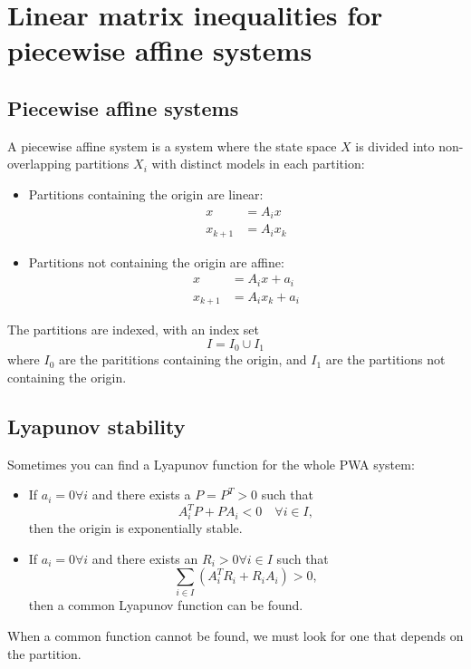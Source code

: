 \section{Linear matrix inequalities for piecewise affine systems}

\subsection{Piecewise affine systems}
A piecewise affine system is a system where the state space $X$ is divided into non-overlapping partitions $X_i$ with distinct models in each partition:
%
\begin{itemize}
  \item Partitions containing the origin are linear:
  \begin{equation}
    \begin{split}
      x &= A_i x \\
      x_{k+1} &= A_i x_k
    \end{split}
  \end{equation}
  \item Partitions not containing the origin are affine:
  \begin{equation}
    \begin{split}
      x &= A_i x + a_i \\
      x_{k+1} &= A_i x_k + a_i
    \end{split}
  \end{equation}
\end{itemize}
%
The partitions are indexed, with an index set
%
\begin{equation}
  I = I_0 \cup I_1
\end{equation}
%
where $I_0$ are the parititions containing the origin, and $I_1$ are the partitions not containing the origin.

\subsection{Lyapunov stability}
Sometimes you can find a Lyapunov function for the whole PWA system:
%
\begin{itemize}
  \item If $a_i = 0 \forall i$ and there exists a $P = P^T > 0$ such that
  \begin{equation}
    A_i^T P + P A_i < 0 \quad \forall i \in I,
  \end{equation}
  then the origin is exponentially stable.
  \item If $a_i = 0 \forall i$ and there exists an $R_i > 0 \forall i \in I$ such that
  \begin{equation}
    \sum_{i \in I} (A_i^T R_i + R_i A_i) > 0,
  \end{equation}
  then a common Lyapunov function can be found.
\end{itemize}
%
When a common function cannot be found, we must look for one that depends on the partition.

